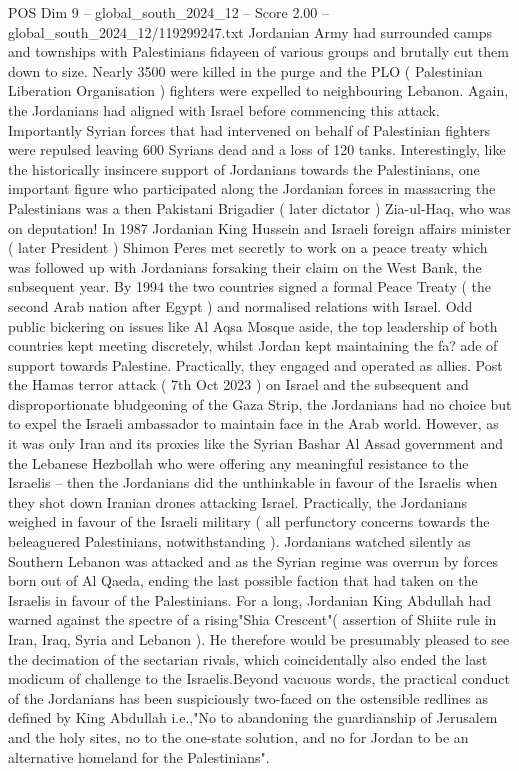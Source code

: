 \begin{textsample}{POS Dim 9 – global\_south\_2024\_12 – Score 2.00 – global\_south\_2024\_12/119299247.txt}
Jordanian Army had surrounded camps and townships with Palestinians fidayeen of various groups and brutally cut them down to size.
Nearly 3500 were killed in the purge and the PLO ( Palestinian Liberation Organisation ) fighters were expelled to neighbouring Lebanon.
Again, the Jordanians had aligned with Israel before commencing this attack.
Importantly Syrian forces that had intervened on behalf of Palestinian fighters were repulsed leaving 600 Syrians dead and a loss of 120 tanks.
Interestingly, like the historically insincere support of Jordanians towards the Palestinians, one important figure who participated along the Jordanian forces in massacring the Palestinians was a then Pakistani Brigadier ( later dictator ) Zia-ul-Haq, who was on deputation!
In 1987 Jordanian King Hussein and Israeli foreign affairs minister ( later President ) Shimon Peres met secretly to work on a peace treaty which was followed up with Jordanians forsaking their claim on the West Bank, the subsequent year.
By 1994 the two countries signed a formal Peace Treaty ( the second Arab nation after Egypt ) and normalised relations with Israel.
Odd public bickering on issues like Al Aqsa Mosque aside, the top leadership of both countries kept meeting discretely, whilst Jordan kept maintaining the fa? ade of support towards Palestine.
Practically, they engaged and operated as allies.
Post the Hamas terror attack ( 7th Oct 2023 ) on Israel and the subsequent and disproportionate bludgeoning of the Gaza Strip, the Jordanians had no choice but to expel the Israeli ambassador to maintain face in the Arab world.
However, as it was only Iran and its proxies like the Syrian Bashar Al Assad government and the Lebanese Hezbollah who were offering any meaningful resistance to the Israelis -- then the Jordanians did the unthinkable in favour of the Israelis when they shot down Iranian drones attacking Israel.
Practically, the Jordanians weighed in favour of the Israeli military ( all perfunctory concerns towards the beleaguered Palestinians, notwithstanding ).
Jordanians watched silently as Southern Lebanon was attacked and as the Syrian regime was overrun by forces born out of Al Qaeda, ending the last possible faction that had taken on the Israelis in favour of the Palestinians.
For a long, Jordanian King Abdullah had warned against the spectre of a rising"Shia Crescent"( assertion of Shiite rule in Iran, Iraq, Syria and Lebanon ).
He therefore would be presumably pleased to see the decimation of the sectarian rivals, which coincidentally also ended the last modicum of challenge to the Israelis.Beyond vacuous words, the practical conduct of the Jordanians has been suspiciously two-faced on the ostensible redlines as defined by King Abdullah i.e.,"No to abandoning the guardianship of Jerusalem and the holy sites, no to the one-state solution, and no for Jordan to be an alternative homeland for the Palestinians".

\end{textsample}
